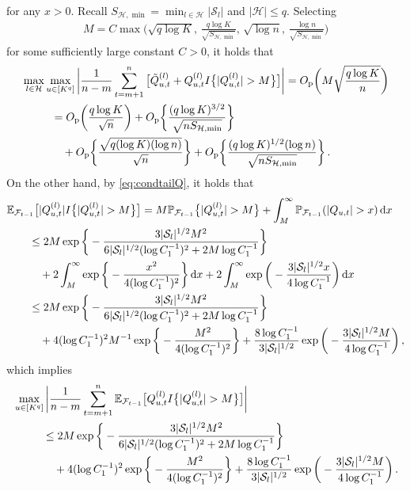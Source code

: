 \documentclass[12pt]{article}
\newcommand{\0}{{\bf 0}}
\begin{document}
for any $x>0$. Recall $S_{\mathcal{H},\min}=\min_{l\in\mathcal{H}}|\mathcal{S}_l|$ and $|\mathcal{H}|\leq q$. Selecting 
\begin{align}\label{eq:Msele}
M= C\max\bigg(\sqrt{q\log K},\,\frac{q\log K}{\sqrt{S_{\mathcal{H},\min}}},\,\sqrt{\log n},\,\frac{\log n}{\sqrt{S_{\mathcal{H},\min}}}\bigg)
\end{align}
for some sufficiently large constant $C>0$, it holds that 
\begin{align}\label{eq:uniconrate1}
&\max_{l\in\mathcal{H}}\max_{u\in[K^q]}\bigg|\frac{1}{n-m}\sum_{t=m+1}^n\big[\tilde{Q}_{u,t}^{(l)}+Q_{u,t}^{(l)}I\big\{|Q_{u,t}^{(l)}|>M\big\}\big]\bigg|=O_{\rm p}\bigg(M\sqrt{\frac{q\log K}{n}}\bigg)\notag\\
&~~~~~~~~=O_{\rm p}\bigg(\frac{q\log K}{\sqrt{n}}\bigg)+O_{\rm p}\bigg\{\frac{(q\log K)^{3/2}}{\sqrt{nS_{\mathcal{H},\min}}}\bigg\}\\
&~~~~~~~~~~~+O_{\rm p}\bigg\{\frac{\sqrt{q(\log K)(\log n)}}{\sqrt{n}}\bigg\}+O_{\rm p}\bigg\{\frac{(q\log K)^{1/2}(\log n)}{\sqrt{nS_{\mathcal{H},\min}}}\bigg\}\,.\notag
\end{align}
On the other hand, by \eqref{eq:condtailQ}, it holds that
\begin{align*}
&\mathbb{E}_{\mathcal{F}_{t-1}}\big[|Q_{u,t}^{(l)}|I\big\{|Q_{u,t}^{(l)}|>M\big\}\big]=M\mathbb{P}_{\mathcal{F}_{t-1}}\big\{|Q_{u,t}^{(l)}|>M\big\}+\int_{M}^\infty\mathbb{P}_{\mathcal{F}_{t-1}}(|Q_{u,t}|>x)\,{\rm d}x\\
&~~~~~~\leq 2M\exp\bigg\{-\frac{3|\mathcal{S}_l|^{1/2}M^2}{6|\mathcal{S}_l|^{1/2}(\log C_1^{-1})^2+2M\log C_1^{-1}}\bigg\}\\
&~~~~~~~~~+2\int_M^\infty\exp\bigg\{-\frac{x^2}{4(\log C_1^{-1})^2}\bigg\}\,{\rm d}x+2\int_M^{\infty}\exp\bigg(-\frac{3|\mathcal{S}_l|^{1/2}x}{4\log C_1^{-1}}\bigg)\,{\rm d}x\\
&~~~~~~\leq 2M\exp\bigg\{-\frac{3|\mathcal{S}_l|^{1/2}M^2}{6|\mathcal{S}_l|^{1/2}(\log C_1^{-1})^2+2M\log C_1^{-1}}\bigg\}\\
&~~~~~~~~~+4(\log C_1^{-1})^2M^{-1}\exp\bigg\{-\frac{M^2}{4(\log C_1^{-1})^2}\bigg\}+\frac{8\log C_1^{-1}}{3|\mathcal{S}_l|^{1/2}}\exp\bigg(-\frac{3|\mathcal{S}_l|^{1/2}M}{4\log C_1^{-1}}\bigg)\,,
\end{align*}
which implies
\begin{align}
&\max_{u\in[K^q]}\bigg|\frac{1}{n-m}\sum_{t=m+1}^n\mathbb{E}_{\mathcal{F}_{t-1}}\big[Q_{u,t}^{(l)}I\big\{|Q_{u,t}^{(l)}|>M\big\}\big]\bigg|\notag\\
&~~~~~~~~\leq 2M\exp\bigg\{-\frac{3|\mathcal{S}_l|^{1/2}M^2}{6|\mathcal{S}_l|^{1/2}(\log C_1^{-1})^2+2M\log C_1^{-1}}\bigg\}\label{eq:bdcond1}\\
&~~~~~~~~~~~+4(\log C_1^{-1})^2\exp\bigg\{-\frac{M^2}{4(\log C_1^{-1})^2}\bigg\}+\frac{8\log C_1^{-1}}{3|\mathcal{S}_l|^{1/2}}\exp\bigg(-\frac{3|\mathcal{S}_l|^{1/2}M}{4\log C_1^{-1}}\bigg)\,.\notag
\end{align}
\end{document}
